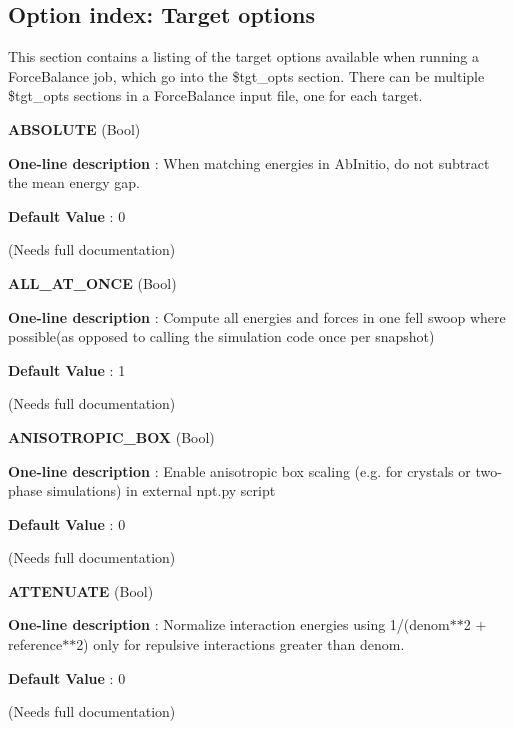 \hypertarget{glossary_tgt_option_index}{}\subsection{Option index\-: Target options}\label{glossary_tgt_option_index}
This section contains a listing of the target options available when running a Force\-Balance job, which go into the \$tgt\-\_\-opts section. There can be multiple \$tgt\-\_\-opts sections in a Force\-Balance input file, one for each target.

\begin{DoxyItemize}
\item {\bfseries  A\-B\-S\-O\-L\-U\-T\-E } (Bool) \par
{\bfseries  One-\/line description }\-: When matching energies in Ab\-Initio, do not subtract the mean energy gap. \par
{\bfseries  Default Value }\-: 0 \par
(Needs full documentation)\end{DoxyItemize}
\begin{DoxyItemize}
\item {\bfseries  A\-L\-L\-\_\-\-A\-T\-\_\-\-O\-N\-C\-E } (Bool) \par
{\bfseries  One-\/line description }\-: Compute all energies and forces in one fell swoop where possible(as opposed to calling the simulation code once per snapshot) \par
{\bfseries  Default Value }\-: 1 \par
(Needs full documentation)\end{DoxyItemize}
\begin{DoxyItemize}
\item {\bfseries  A\-N\-I\-S\-O\-T\-R\-O\-P\-I\-C\-\_\-\-B\-O\-X } (Bool) \par
{\bfseries  One-\/line description }\-: Enable anisotropic box scaling (e.\-g. for crystals or two-\/phase simulations) in external npt.\-py script \par
{\bfseries  Default Value }\-: 0 \par
(Needs full documentation)\end{DoxyItemize}
\begin{DoxyItemize}
\item {\bfseries  A\-T\-T\-E\-N\-U\-A\-T\-E } (Bool) \par
{\bfseries  One-\/line description }\-: Normalize interaction energies using 1/(denom$\ast$$\ast$2 + reference$\ast$$\ast$2) only for repulsive interactions greater than denom. \par
{\bfseries  Default Value }\-: 0 \par
(Needs full documentation)\end{DoxyItemize}
